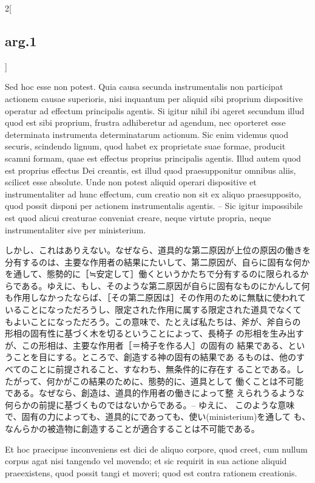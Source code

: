 \documentclass[paper=a4paper,fontsize=10pt,jafontsize=9pt,titlepage]{jlreq}
\begin{document}
\begin{paracol}{2}[\subsection{arg.1}]
\switchcolumn*

Sed hoc esse non potest. Quia causa secunda instrumentalis
 non participat actionem causae superioris, nisi inquantum per aliquid
 sibi proprium dispositive operatur ad effectum principalis agentis. Si
 igitur nihil ibi ageret secundum illud quod est sibi proprium, frustra
 adhiberetur ad agendum, nec oporteret esse determinata instrumenta
 determinatarum actionum. Sic enim videmus quod securis, scindendo
 lignum, quod habet ex proprietate suae formae, producit scamni formam,
 quae est effectus proprius principalis agentis. Illud autem quod est
 proprius effectus Dei creantis, est illud quod praesupponitur omnibus
 aliis, scilicet esse absolute. Unde non potest aliquid operari
 dispositive et instrumentaliter ad hunc effectum, cum creatio non sit
 ex aliquo praesupposito, quod possit disponi per actionem
 instrumentalis agentis. -- Sic igitur impossibile est quod alicui
 creaturae conveniat creare, neque virtute propria, neque
 instrumentaliter sive per ministerium.

\switchcolumn

しかし、これはありえない。なぜなら、道具的な第二原因が上位の原因の働きを
分有するのは、主要な作用者の結果にたいして、第二原因が、自らに固有な何か
を通して、態勢的に［≒安定して］働くというかたちで分有するのに限られるか
らである。ゆえに、もし、そのような第二原因が自らに固有なものにかんして何
も作用しなかったならば、［その第二原因は］その作用のために無駄に使われて
 いることになっただろうし、限定された作用に属する限定された道具でなくて
 もよいことになっただろう。この意味で、たとえば私たちは、斧が、斧自らの
 形相の固有性に基づく木を切るということによって、長椅子
 の形相を生み出すが、この形相は、主要な作用者［＝椅子を作る人］の固有の
 結果である、ということを目にする。ところで、創造する神の固有の結果であ
 るものは、他のすべてのことに前提されること、すなわち、無条件的に存在す
 ることである。したがって、何かがこの結果のために、態勢的に、道具として
 働くことは不可能である。なぜなら、創造は、道具的作用者の働きによって整
 えられうるような何らかの前提に基づくものではないからである。-- ゆえに、
 このような意味で、固有の力によっても、道具的にであっても、使い(ministerium)を通して
 も、なんらかの被造物に創造することが適合することは不可能である。

\switchcolumn*

Et hoc praecipue inconveniens
 est dici de aliquo corpore, quod creet, cum nullum corpus agat nisi
 tangendo vel movendo; et sic requirit in sua actione aliquid
 praeexistens, quod possit tangi et moveri; quod est contra rationem
 creationis.


\end{paracol}
\end{document}
